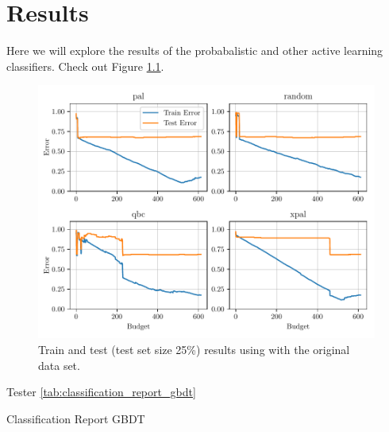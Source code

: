 \chapter{Results}

Here we will explore the results of the probabalistic and other active learning classifiers. Check out Figure \ref{fig:plot_all_results}.

\begin{figure}[!ht]
  \centering
  \includegraphics[width=\textwidth]{../img/plot_all_results.pdf}
  \caption{Train and test (test set size 25\%) results using with the original data set.}
  \label{fig:plot_all_results}
\end{figure}


Tester \ref{tab:classification_report_gbdt}

\begin{table}[ht]
\centering
\caption{Classification Report GBDT}

\label{tab:classification_report_gbdt}
\end{table}